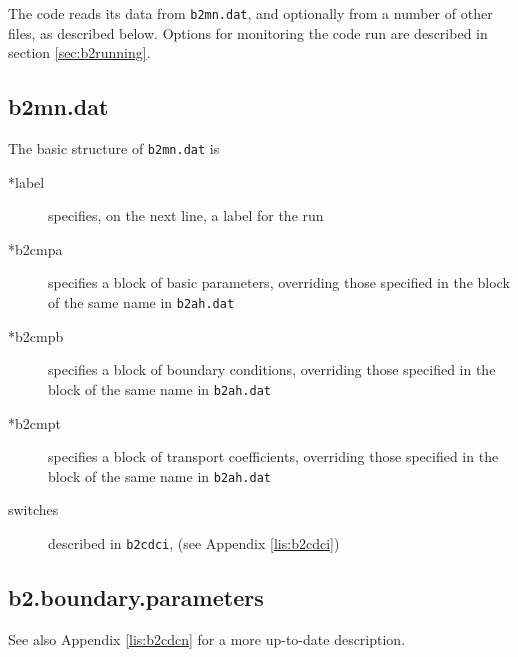 \documentclass[a4paper,10pt]{report}
\begin{document}
The code reads its data from {\tt b2mn.dat}, and optionally from a
number of other files, as described below.  Options for monitoring the
code run are described in section \ref{sec:b2running}.

\subsection{b2mn.dat}


The basic structure of {\tt b2mn.dat} is
\begin{description}
  \item[*label] specifies, on the next line, a label for the run
  \item[*b2cmpa] specifies a block of basic parameters, overriding
  those specified in the block of the same name in {\tt b2ah.dat}
  \item[*b2cmpb] specifies a block of boundary conditions, overriding
  those specified in the block of the same name in {\tt b2ah.dat}
  \item[*b2cmpt] specifies a block of transport coefficients, overriding
  those specified in the block of the same name in {\tt b2ah.dat}
  \item[switches] described in {\tt b2cdci}, (see Appendix \ref{lis:b2cdci})
\end{description}

\subsection{b2.boundary.parameters}
\label{lab:b2:boundary:parameters}

See also Appendix \ref{lis:b2cdcn} for a more up-to-date description.
\end{document}
